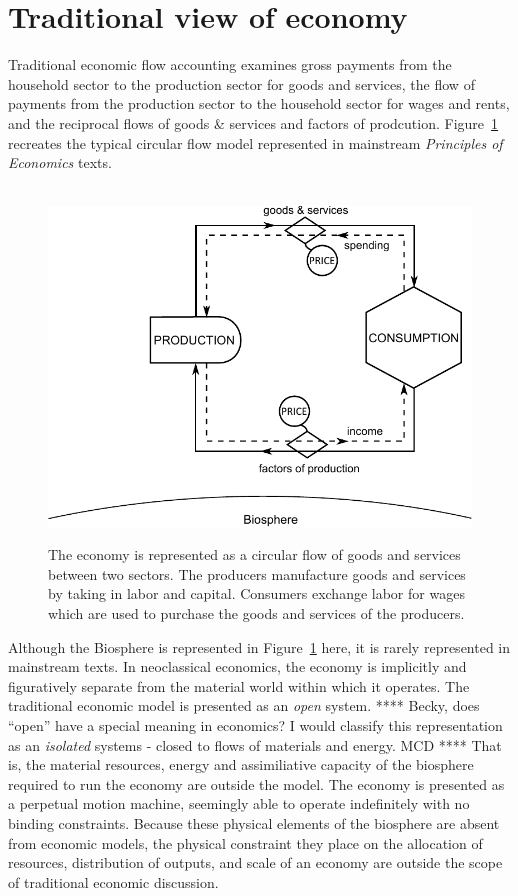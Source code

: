 \section{Traditional view of economy}

Traditional economic flow accounting examines gross payments 
from the household sector to the production sector for goods and services, the flow of payments from the production sector 
to the household sector for wages and rents, and the reciprocal flows of goods \& services and factors of prodcution. Figure~\ref{fig:perp_motion_1} 
recreates the typical circular flow model represented in mainstream \emph{Principles of Economics} texts.

\begin{figure}[!ht]
\label{fig:perp_motion_1}
\centering\
\includegraphics[width=\linewidth]{Part_0/Chapter_Introduction/images/Perpetual_motion_1.pdf}
\caption[The traditional economic model of the economy]{The economy 
is represented as a circular flow of goods and services between two sectors. 
The producers manufacture goods and services 
by taking in labor and capital. 
Consumers exchange labor for wages 
which are used to purchase 
the goods and services of the producers.}
\end{figure}

Although the Biosphere is represented in
Figure~\ref{fig:perp_motion_1} 
here, it is rarely represented in mainstream texts. 
In neoclassical economics, the economy is implicitly and figuratively separate from the material world within which it operates.
The traditional economic model is presented as an \emph{open} system. 
**** Becky, does ``open'' have a special meaning in economics?
I would classify this representation as an \emph{isolated} systems
- closed to flows of materials and energy. MCD ****
That is, the material resources, energy
and assimiliative capacity of the biosphere required to run the economy are outside the model.
The economy is presented as a perpetual motion machine, seemingly able to
operate indefinitely with no binding constraints.
Because these physical elements of the biosphere are absent from economic models,
the physical constraint they place on the allocation of resources, distribution of outputs, and 
scale of an economy are outside the scope of traditional economic discussion.

